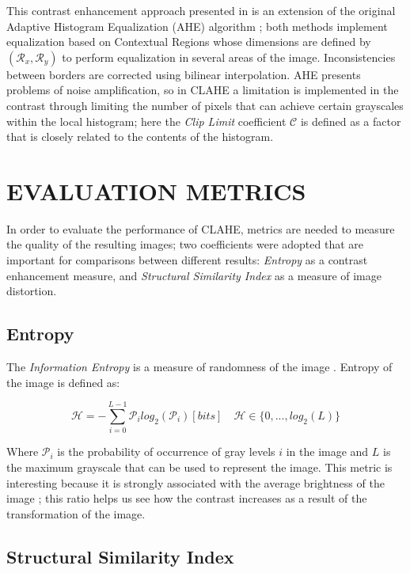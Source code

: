 \documentclass[spanish,twocolumn]{article}
\begin{document}
This contrast enhancement approach presented in \cite{Zuiderveld:1994:CLA:180895.180940} is an extension of the original Adaptive Histogram Equalization (AHE) algorithm \cite{pizer1987adaptive}; both methods implement equalization based on Contextual Regions whose dimensions are defined by $(\mathcal{R}_x, \mathcal{R}_y)$ to perform equalization in several areas of the image. Inconsistencies between borders are corrected using bilinear interpolation. AHE presents problems of noise amplification, so in CLAHE a limitation is implemented in the contrast through limiting the number of pixels that can achieve certain grayscales within the local histogram; here the {\it Clip Limit} coefficient $\mathcal{C}$ is defined as a factor that is closely related to the contents of the histogram.


\section{EVALUATION METRICS}
\label{sec:metricas}

In order to evaluate the performance of CLAHE, metrics are needed to measure the quality of the resulting images; two coefficients were adopted that are important for comparisons between different results:  {\it Entropy} as a contrast enhancement measure, and {\it Structural Similarity Index} as a measure of image distortion.  

\subsection{Entropy}
\label{ssec:entropia}

The {\it Information Entropy} is a measure of randomness of the image \cite{tsai2008information}. Entropy of the image is defined as:

\begin{equation}\label{eq:entropia}
\mathscr{H}=-\sum_{i=0}^{L-1}\mathcal{P}_i log_2(\mathcal{P}_i) [bits] \quad \mathscr{H} \in \{0,...,log_2(L)\} 
\end{equation}

Where $\mathcal{P}_i$ is the probability of occurrence of gray levels $i$ in the image and $L$ is the maximum grayscale that can be used to represent the image. This metric is interesting because it is strongly associated with the average brightness of the image \cite{108593}; this ratio helps us see how the contrast increases as a result of the transformation of the image.

\subsection{Structural Similarity Index}
\label{ssec:ssim}
\end{document}
